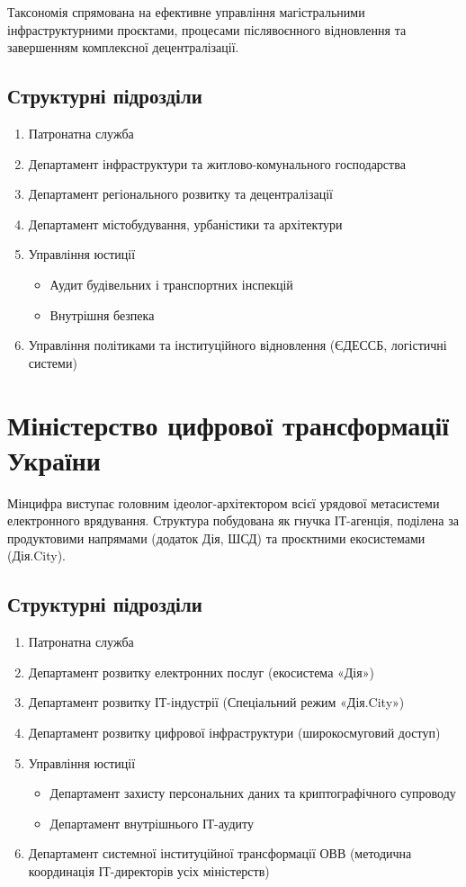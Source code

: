Таксономія спрямована на ефективне управління магістральними інфраструктурними проєктами, процесами післявоєнного відновлення та завершенням комплексної децентралізації.

\subsection*{Структурні підрозділи}

\begin{enumerate}
    \item Патронатна служба
    \item Департамент інфраструктури та житлово-комунального господарства
    \item Департамент регіонального розвитку та децентралізації
    \item Департамент містобудування, урбаністики та архітектури
    \item Управління юстиції
    \begin{itemize}
        \item Аудит будівельних і транспортних інспекцій
        \item Внутрішня безпека
    \end{itemize}
    \item Управління політиками та інституційного відновлення (ЄДЕССБ, логістичні системи)
\end{enumerate}

\newpage
\section{Міністерство цифрової трансформації України}

Мінцифра виступає головним ідеолог-архітектором всієї урядової метасистеми електронного врядування. Структура побудована як гнучка ІТ-агенція, поділена за продуктовими напрямами (додаток Дія, ШСД) та проєктними екосистемами (Дія.City).

\subsection*{Структурні підрозділи}

\begin{enumerate}
    \item Патронатна служба
    \item Департамент розвитку електронних послуг (екосистема «Дія»)
    \item Департамент розвитку ІТ-індустрії (Спеціальний режим «Дія.City»)
    \item Департамент розвитку цифрової інфраструктури (широкосмуговий доступ)
    \item Управління юстиції
    \begin{itemize}
        \item Департамент захисту персональних даних та криптографічного супроводу
        \item Департамент внутрішнього ІТ-аудиту
    \end{itemize}
    \item Департамент системної інституційної трансформації ОВВ (методична координація ІТ-директорів усіх міністерств)
\end{enumerate}

